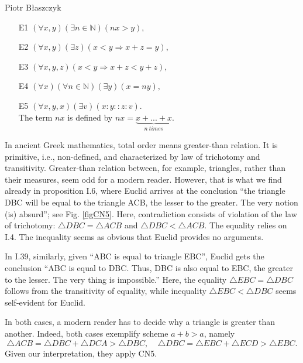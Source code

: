 \begin{artengenv}{Piotr Błaszczyk}
\begin{itemize}\itemsep 0.5mm\itemsep 0.5mm
\item [E1] $(\forall{x,y})(\exists n \in \mathbb{N}) (nx> y),$
\item [E2] $(\forall{x,y})(\exists z) ( x<y \Rightarrow x+z=y),$
\item [E3] $(\forall{x,y,z})(x < y \Rightarrow x+z <y+z),$
\item [E4] $(\forall {x}) (\forall n \in \mathbb{N})(\exists y)(x=ny),$
 \item [E5] $(\forall x,y,x)(\exists v)(x:y::z:v)$.\\
The term $nx$ is defined by $nx=\underbrace{x+...+x}_{n\ times}$.
\end{itemize} 

In ancient Greek mathematics, total order  means {greater-than} relation.  It is  primitive, i.e., non-defined, 
and characterized by law of trichotomy  and transitivity.
{Greater-than} relation between, for example, triangles, rather than their measures, seem odd for a modern reader. However, that is what we find already in proposition I.6, where Euclid arrives at the conclusion
``the triangle DBC will be equal to the triangle ACB, 
the lesser to the greater. The very notion (is) absurd''; see Fig. \ref{figCN5}. Here, contradiction consists of violation of the law of trichotomy:  $\triangle DBC =\triangle ACB$  and $\triangle DBC <\triangle ACB$. The  equality relies on I.4. The inequality seems as obvious that Euclid provides no arguments.






In I.39, similarly, given  ``ABC is equal to  triangle
EBC'', Euclid gets the conclusion ``ABC is equal to
DBC. Thus, DBC is also equal to EBC, the greater to
the lesser. The very thing is impossible.'' Here, the equality $\triangle EBC=\triangle DBC$ follows from the transitivity of equality, while inequality $\triangle EBC<\triangle DBC$ seems self-evident for Euclid.


In both cases, a modern reader has to decide why a triangle is greater than another.
Indeed, both cases exemplify scheme $a+b>a$, namely 
\begin{equation}\triangle ACB=\triangle DBC +\triangle DCA> \triangle DBC, \ \ \ \ \ \triangle DBC=\triangle EBC+\triangle ECD > \triangle EBC.\end{equation}
Given our interpretation, they apply CN5.




\end{artengenv}
